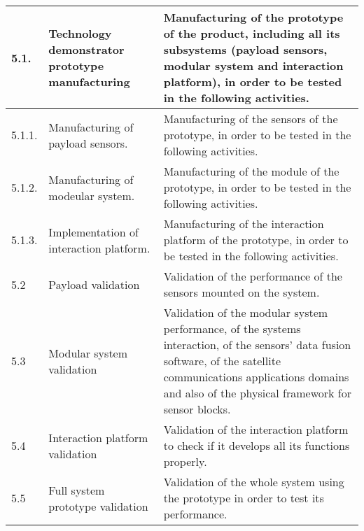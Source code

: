 \begin{longtable}[H]{l >{\raggedright\arraybackslash}p{4cm} p{8cm}}
	5.1. & Technology demonstrator prototype manufacturing & Manufacturing of the prototype of the product, including all its subsystems (payload sensors, modular system and interaction platform), in order to be tested in the following activities.\vspace{0.2cm} \\
	
	\midrule
	
	5.1.1. & Manufacturing of payload sensors. & Manufacturing of the sensors of the prototype, in order to be tested in the following activities.\vspace{0.2cm} \\
	
	\midrule
	
	5.1.2. & Manufacturing of modeular system. & Manufacturing of the module of the prototype, in order to be tested in the following activities.\vspace{0.2cm} \\
	
	\midrule
	
	5.1.3. & Implementation of interaction platform. & Manufacturing of the interaction platform of the prototype, in order to be tested in the following activities.\vspace{0.2cm} \\
	
	\midrule
	
	5.2 & Payload validation & Validation of the performance of the sensors mounted on the system.\vspace{0.2cm} \\
	
	\midrule
	
	5.3 & Modular system validation & Validation of the modular system performance, of the systems interaction, of the sensors' data fusion software, of the satellite communications applications domains and also of the physical framework for sensor blocks.\vspace{0.2cm} \\
	
	\midrule
	
	5.4 & Interaction platform validation & Validation of the interaction platform to check if it develops all its functions properly.\vspace{0.2cm} \\
	
	\midrule
	
	5.5 & Full system prototype validation & Validation of the whole system using the prototype in order to test its performance.\vspace{0.2cm} \\
	

\end{longtable}
